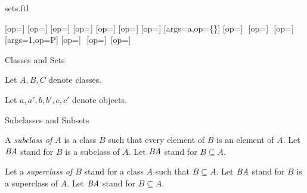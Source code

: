 \documentclass{naproche-library}
\begin{document}
\begin{smodule}{sets.ftl}


\STEXexport{
  \let\oldsubseteq\subseteq
  \let\subseteq\relax
  \let\oldsubset\subset
  \let\subset\relax
  \let\oldsupseteq\supseteq
  \let\supseteq\relax
  \let\oldsupset\supset
  \let\supset\relax
  \let\oldsubsetneq\subsetneq
  \let\subsetneq\relax
  \let\oldsupsetneq\supsetneq
  \let\supsetneq\relax
  \let\oldemptyset\emptyset
  \let\emptyset\relax
  \let\oldcup\cup
  \let\cup\relax
  \let\oldcap\cap
  \let\cap\relax
  \let\oldsetminus\setminus
  \let\setminus\relax
  \let\oldtimes\times
  \let\times\relax
  \let\oldbigcup\bigcup
  \let\bigcup\relax
  \let\oldbigcap\bigcap
  \let\bigcap\relax
}
[op=\oldsubseteq]{\;\oldsubseteq\;}
[op=\oldsubset]{\;\oldsubset\;}
[op=\oldsupseteq]{\;\oldsupseteq\;}
[op=\oldsupset]{\;\oldsupset\;}
[op=\oldsubsetneq]{\;\oldsubsetneq\;}
[op=\oldsupsetneq]{\;\oldsupsetneq\;}
[op=\oldemptyset]{\oldemptyset}
[args=a,op=\{\cdot\}]{\comp{\{}\comp{\}}}
[op=\oldcup]{\,\oldcup\,}
[op=\oldcap]{\,\oldcap\,}
[op=\oldsetminus]{\,\oldsetminus\,}
[args=1,op=\mathcal P]{}
[op=\oldtimes]{\,\oldtimes\,}
[op=\oldbigcup]{\oldbigcup\,}
[op=\oldbigcap]{\oldbigcap\,}

\begin{sfragment}{Classes and Sets}
  \begin{forthel}
    Let $A,B,C$ denote classes.

    Let $a,a',b,b',c,c'$ denote objects.
  \end{forthel}

  \begin{sfragment}{Subclasses and Subsets}
    \begin{definition*}[forthel,id=SubclassDef]
      A \emph{subclass of $A$} is a class $B$ such that every element of $B$ is an element of $A$.
      Let $\emph{B\subseteq A}$ stand for $B$ is a subclass of $A$.
      Let $\emph{B\subset A}$ stand for $B\subseteq A$.

      Let a \emph{superclass of $B$} stand for a class $A$ such that $B\subseteq A$.
      Let $\emph{B\supseteq A}$ stand for $B$ is a superclass of $A$.
      Let $\emph{B\supset A}$ stand for $B\subseteq A$.


\end{definition*}
\end{sfragment}
\end{sfragment}
\end{smodule}
\end{document}
